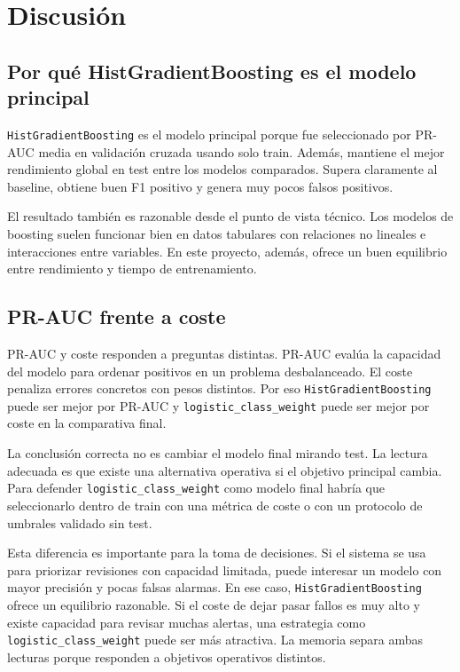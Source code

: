 \documentclass[11pt,a4paper]{article}
\begin{document}
\section{Discusión}
\label{sec_discusion}

\subsection{Por qué HistGradientBoosting es el modelo principal}

\texttt{HistGradientBoosting} es el modelo principal porque fue seleccionado por PR-AUC media en validación cruzada usando solo train. Además, mantiene el mejor rendimiento global en test entre los modelos comparados. Supera claramente al baseline, obtiene buen F1 positivo y genera muy pocos falsos positivos.

El resultado también es razonable desde el punto de vista técnico. Los modelos de boosting suelen funcionar bien en datos tabulares con relaciones no lineales e interacciones entre variables. En este proyecto, además, ofrece un buen equilibrio entre rendimiento y tiempo de entrenamiento.

\subsection{PR-AUC frente a coste}

PR-AUC y coste responden a preguntas distintas. PR-AUC evalúa la capacidad del modelo para ordenar positivos en un problema desbalanceado. El coste penaliza errores concretos con pesos distintos. Por eso \texttt{HistGradientBoosting} puede ser mejor por PR-AUC y \texttt{logistic\_class\_weight} puede ser mejor por coste en la comparativa final.

La conclusión correcta no es cambiar el modelo final mirando test. La lectura adecuada es que existe una alternativa operativa si el objetivo principal cambia. Para defender \texttt{logistic\_class\_weight} como modelo final habría que seleccionarlo dentro de train con una métrica de coste o con un protocolo de umbrales validado sin test.

Esta diferencia es importante para la toma de decisiones. Si el sistema se usa para priorizar revisiones con capacidad limitada, puede interesar un modelo con mayor precisión y pocas falsas alarmas. En ese caso, \texttt{HistGradientBoosting} ofrece un equilibrio razonable. Si el coste de dejar pasar fallos es muy alto y existe capacidad para revisar muchas alertas, una estrategia como \texttt{logistic\_class\_weight} puede ser más atractiva. La memoria separa ambas lecturas porque responden a objetivos operativos distintos.
\end{document}
